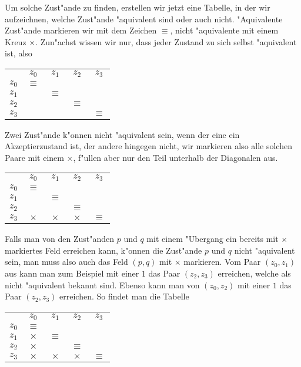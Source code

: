 Um solche Zust"ande zu finden, erstellen wir jetzt eine Tabelle, in der
wir aufzeichnen, welche Zust"ande "aquivalent sind oder auch nicht.
"Aquivalente Zust"ande markieren wir mit dem Zeichen $\equiv$, nicht
"aquivalente mit einem Kreuz $\times$.
Zun"achst wissen wir nur, dass jeder Zustand zu sich selbst "aquivalent
ist, also
\begin{center}
\begin{tabular}{ccccc}
     &$z_0$   &$z_1$   &$z_2$   &$z_3$   \\
$z_0$&$\equiv$&        &        &        \\
$z_1$&        &$\equiv$&        &        \\
$z_2$&        &        &$\equiv$&        \\
$z_3$&        &        &        &$\equiv$
\end{tabular}
\end{center}
Zwei Zust"ande k"onnen nicht "aquivalent sein, wenn der eine
ein Akzeptierzustand ist, der andere hingegen nicht, wir markieren
also alle solchen Paare mit einem $\times$, f"ullen aber nur den Teil unterhalb der
Diagonalen aus.
\begin{center}
\begin{tabular}{ccccc}
     &$z_0$   &$z_1$   &$z_2$   &$z_3$   \\
$z_0$&$\equiv$&        &        &        \\
$z_1$&        &$\equiv$&        &        \\
$z_2$&        &        &$\equiv$&        \\
$z_3$&$\times$&$\times$&$\times$&$\equiv$
\end{tabular}
\end{center}
Falls man von den Zust"anden $p$ und $q$ mit einem "Ubergang
ein bereits mit $\times$ markiertes Feld erreichen kann, k"onnen die
Zust"ande $p$ und $q$ nicht "aquivalent sein, man muss also auch das
Feld $(p,q)$ mit $\times$ markieren.
Vom Paar $(z_0,z_1)$ aus kann man zum Beispiel mit einer $1$ das
Paar $(z_2,z_3)$ erreichen, welche als nicht "aquivalent bekannt
sind. Ebenso kann man von $(z_0,z_2)$ mit einer $1$ das Paar
$(z_2,z_3)$ erreichen. So findet man die Tabelle
\begin{center}
\begin{tabular}{ccccc}
     &$z_0$   &$z_1$   &$z_2$   &$z_3$   \\
$z_0$&$\equiv$&        &        &        \\
$z_1$&$\times$&$\equiv$&        &        \\
$z_2$&$\times$&        &$\equiv$&        \\
$z_3$&$\times$&$\times$&$\times$&$\equiv$
\end{tabular}
\end{center}
